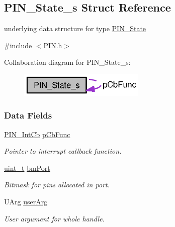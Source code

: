 \subsection{P\+I\+N\+\_\+\+State\+\_\+s Struct Reference}
\label{struct_p_i_n___state__s}


underlying data structure for type \hyperlink{_p_i_n_8h_a36ef69d50df6baa6973482669c24a522}{P\+I\+N\+\_\+\+State}  




{\ttfamily \#include $<$P\+I\+N.\+h$>$}



Collaboration diagram for P\+I\+N\+\_\+\+State\+\_\+s\+:
\nopagebreak
\begin{figure}[H]
\begin{center}
\leavevmode
\includegraphics[width=170pt]{struct_p_i_n___state__s__coll__graph}
\end{center}
\end{figure}
\subsubsection*{Data Fields}
\begin{DoxyCompactItemize}
\item 
\hyperlink{_p_i_n_8h_a289cbfdcb1e23ade7c3b0f5fc3b2d695}{P\+I\+N\+\_\+\+Int\+Cb} \hyperlink{struct_p_i_n___state__s_a4cae3c3e38b67189531fa4e467b49b2d}{p\+Cb\+Func}
\begin{DoxyCompactList}\small\item\em Pointer to interrupt callback function. \end{DoxyCompactList}\item 
\hyperlink{_p_i_n_8h_a12a1e9b3ce141648783a82445d02b58d}{uint\+\_\+t} \hyperlink{struct_p_i_n___state__s_a28cbcd4b8adc0ddbbc14a83cd272574b}{bm\+Port}
\begin{DoxyCompactList}\small\item\em Bitmask for pins allocated in port. \end{DoxyCompactList}\item 
U\+Arg \hyperlink{struct_p_i_n___state__s_ad999027739394724e799929859d6a61e}{user\+Arg}
\begin{DoxyCompactList}\small\item\em User argument for whole handle. \end{DoxyCompactList}\end{DoxyCompactItemize}


